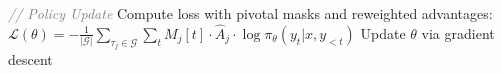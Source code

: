 \begin{algorithm*}[t]
\begin{algorithmic}[1]
        \STATE \textcolor{gray}{\textit{// Policy Update}}
        \STATE Compute loss with pivotal masks and reweighted advantages:
        \STATE $\mathcal{L}(\theta) = -\frac{1}{|\mathcal{G}|} \sum_{\tau_j \in \mathcal{G}} \sum_{t} M_j[t] \cdot \hat{A}_j \cdot \log \pi_{\theta}(y_t | x, y_{<t})$
        \STATE Update $\theta$ via gradient descent
    \ENDFOR
\ENDWHILE
\end{algorithmic}
\end{algorithm*}
